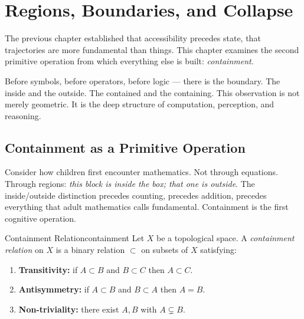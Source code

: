 
\chapter{Regions, Boundaries, and Collapse}



The previous chapter established that accessibility precedes state, that
trajectories are more fundamental than things. This chapter examines the
second primitive operation from which everything else is built: \emph{containment}.

Before symbols, before operators, before logic — there is the boundary. The
inside and the outside. The contained and the containing. This observation
is not merely geometric. It is the deep structure of computation, perception,
and reasoning.

\section{Containment as a Primitive Operation}

Consider how children first encounter mathematics. Not through equations.
Through regions: \emph{this block is inside the box; that one is outside}. The
inside/outside distinction precedes counting, precedes addition, precedes
everything that adult mathematics calls fundamental. Containment is the
first cognitive operation.

\begin{definition}{Containment Relation}{containment}
  Let $X$ be a topological space. A \emph{containment relation} on
  $X$ is a binary relation $\subset$ on subsets of $X$ satisfying:
  \begin{enumerate}
    \item \textbf{Transitivity:} if $A \subset B$ and $B \subset C$
          then $A \subset C$.
    \item \textbf{Antisymmetry:} if $A \subset B$ and $B \subset A$
          then $A = B$.
    \item \textbf{Non-triviality:} there exist $A, B$ with
          $A \subsetneq B$.
  \end{enumerate}
\end{definition}


